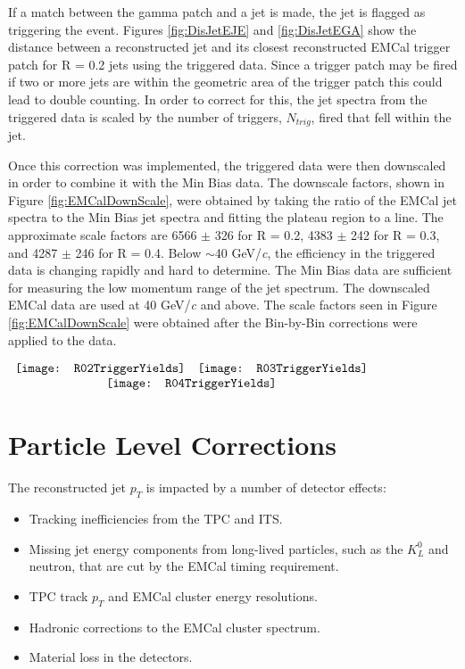 \noindent
If a match between the gamma patch and a jet is made, the jet is flagged as triggering the event.  Figures \ref{fig:DisJetEJE} and \ref{fig:DisJetEGA} show the distance between a reconstructed jet and its closest reconstructed EMCal trigger patch for R = 0.2 jets using the triggered data.  Since a trigger patch may be fired if two or more jets are within the geometric area of the trigger patch this could lead to double counting.  In order to correct for this, the jet spectra from the triggered data is scaled by the number of triggers, $N_{trig}$, fired that fell within the jet.  

Once this correction was implemented, the triggered data were then downscaled in order to combine it with the Min Bias data.  The downscale factors, shown in Figure \ref{fig:EMCalDownScale}, were obtained by taking the ratio of the EMCal jet spectra to the Min Bias jet spectra and fitting the plateau region to a line.  The approximate scale factors are 6566 $\pm$ 326 for R = 0.2, 4383 $\pm$ 242 for R = 0.3, and 4287 $\pm$ 246 for R = 0.4.  Below $\sim$40 GeV/\textit{c}, the efficiency in the triggered data is changing rapidly and hard to determine.  The Min Bias data are sufficient for measuring the low momentum range of the jet spectrum.  The downscaled EMCal data are used at 40 GeV/\textit{c} and above.  The scale factors seen in Figure \ref{fig:EMCalDownScale} were obtained after the Bin-by-Bin corrections were applied to the data.


\begin{figure*}[t!]
$\begin{array}{rl}
    \texttt{[image: R02TriggerYields]} &
    \texttt{[image: R03TriggerYields]}\\
    \multicolumn{2}{c}{\texttt{[image: R04TriggerYields]}}
\end{array}$
\caption[EMCal triggered data correction factors for R=0.2, R=0.3, and R=0.4 jets.]{\label{fig:EMCalDownScale}EMCal triggered data correction factors for R=0.2, R=0.3, and R=0.4 jets.}
\end{figure*}
 

\section{Particle Level Corrections}

The reconstructed jet $p_{T}$ is impacted by a number of detector effects:

\begin{itemize}
\item Tracking inefficiencies from the TPC and ITS.
\item Missing jet energy components from long-lived particles, such as the $K^{0}_{L}$ and neutron, that are cut by the EMCal timing requirement.
\item TPC track $p_{T}$ and EMCal cluster energy resolutions.
\item Hadronic corrections to the EMCal cluster spectrum.
\item Material loss in the detectors.
\end{itemize}

